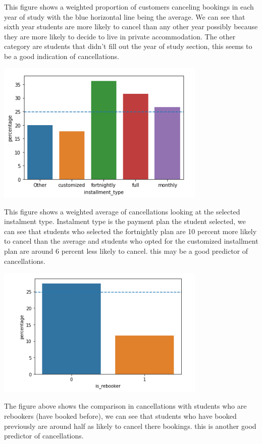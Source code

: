   This figure shows a weighted proportion of customers canceling bookings in each year of study with the blue horizontal line being the average. We can see that sixth year students are more likely to cancel than any other year possibly because they are more likely to decide to live in private accommodation. The other category are students that didn't fill out the year of study section, this seems to be a good indication of cancellations.
  
  \includegraphics[width=10cm]{figures/instalment_type.png}
  
  This figure shows a weighted average of cancellations looking at the selected instalment type. Instalment type is the payment plan the student selected, we can see that students who selected the fortnightly plan are 10 percent more likely to cancel than the average and students who opted for the customized installment plan are around 6 percent less likely to cancel. this may be a good predictor of cancellations.
  
  \includegraphics[width=10cm]{figures/is_rebooker.png}
  
  The figure above shows the comparison in cancellations with students who are rebookers (have booked before), we can see that students who have booked previously are around half as likely to cancel there bookings. this is another good predictor of cancellations.  
  

